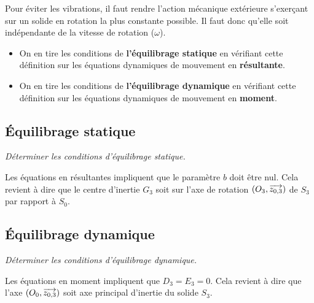 \begin{definition}
Pour éviter les vibrations, il faut rendre l'action mécanique extérieure s'exerçant sur un solide en rotation la plus constante possible. Il faut donc qu'elle soit indépendante de la vitesse de rotation ($\omega$).
\begin{itemize}
\item On en tire les conditions de \textbf{l'équilibrage statique} en vérifiant cette définition sur les équations dynamiques de mouvement en \textbf{résultante}.
\item On en tire les conditions de \textbf{l'équilibrage dynamique} en vérifiant cette définition sur les équations dynamiques de mouvement en \textbf{moment}.
\end{itemize}
 
\end{definition}

\subsection{Équilibrage statique}

\begin{exemple}

\textit{Déterminer les conditions d'équilibrage statique.}

Les équations en résultantes impliquent que le paramètre $b$ doit être nul. Cela revient à dire que le centre d'inertie $G_3$ soit sur l'axe de rotation $\left(O_3,\overrightarrow{z_{0,3}}\right)$ de $S_3$ par rapport à $S_0$.
\end{exemple}


\subsection{Équilibrage dynamique}

\begin{exemple}
\textit{Déterminer les conditions d'équilibrage dynamique.}

Les équations en moment impliquent que $D_3=E_3=0$.
Cela revient à dire que l'axe $\left(O_0,\overrightarrow{{z_{0,3}}}\right)$ soit axe principal d'inertie du solide $S_3$.
\end{exemple}
%

